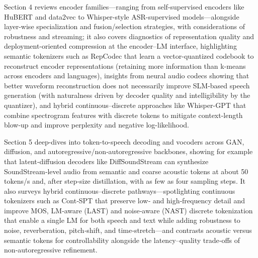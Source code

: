 \documentclass{article}
\begin{document}
Section 4 reviews encoder families—ranging from self-supervised encoders like HuBERT and data2vec to Whisper-style ASR-supervised models—alongside layer-wise specialization and fusion/selection strategies, with considerations of robustness and streaming; it also covers diagnostics of representation quality and deployment-oriented compression at the encoder–LM interface, highlighting semantic tokenizers such as RepCodec that learn a vector-quantized codebook to reconstruct encoder representations (retaining more information than k-means across encoders and languages), insights from neural audio codecs showing that better waveform reconstruction does not necessarily improve SLM-based speech generation (with naturalness driven by decoder quality and intelligibility by the quantizer), and hybrid continuous–discrete approaches like Whisper-GPT that combine spectrogram features with discrete tokens to mitigate context-length blow-up and improve perplexity and negative log-likelihood. \cite{verma2024whispergpthybridrepresentationaudiolarge,li2024investigatingneuralaudiocodecsspeechlang,huang2024repcodecspeechrepresentationcodectokeniz} 



Section 5 deep-dives into token-to-speech decoding and vocoders across GAN, diffusion, and autoregressive/non‑autoregressive backbones, showing for example that latent‑diffusion decoders like DiffSoundStream can synthesize SoundStream‑level audio from semantic and coarse acoustic tokens at about 50 tokens/s and, after step‑size distillation, with as few as four sampling steps. It also surveys hybrid continuous–discrete pathways—spotlighting continuous tokenizers such as Cont‑SPT that preserve low‑ and high‑frequency detail and improve MOS, LM‑aware (LAST) and noise‑aware (NAST) discrete tokenization that enable a single LM for both speech and text while adding robustness to noise, reverberation, pitch‑shift, and time‑stretch—and contrasts acoustic versus semantic tokens for controllability alongside the latency–quality trade‑offs of non‑autoregressive refinement. \cite{li2025continuousspeechtokenizertext,turetzky2024lastlanguagemodelawarespeechtokenization,yang2025diffsoundstreamefficientspeechtokenizati,messica2024nastnoiseawarespeechtokenizationlanguage,guo2025recentadvancesdiscretespeechtokensreview} 
\end{document}

